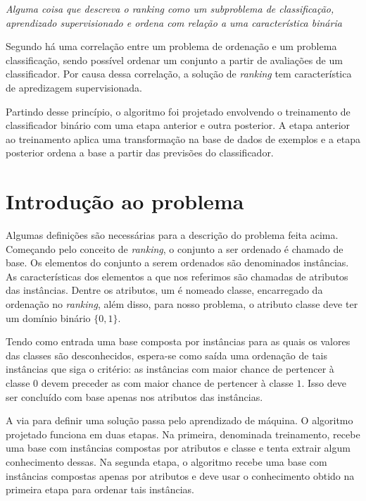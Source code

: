 \emph{Alguma coisa que descreva o ranking como um subproblema de classificação, aprendizado supervisionado e ordena com relação a uma característica binária}

Segundo \cite{langford08} há uma correlação entre um problema de ordenação e um problema classificação, sendo possível ordenar um conjunto a partir de avaliações de um classificador. Por causa dessa correlação, a solução de \emph{ranking} tem característica de apredizagem supervisionada.

Partindo desse princípio, o algoritmo foi projetado envolvendo o treinamento de classificador binário com uma etapa anterior e outra posterior. A etapa anterior ao treinamento aplica uma transformação na base de dados de exemplos e a etapa posterior  ordena a base a partir das previsões do classificador.


\section{Introdução ao problema}
Algumas definições são necessárias para a descrição do problema feita acima.
Começando pelo conceito de \emph{ranking}, o conjunto a ser ordenado é chamado
de base. Os elementos do conjunto a serem ordenados são denominados instâncias.
As características dos elementos a que nos referimos são chamadas de atributos
das instâncias. Dentre os atributos, um é nomeado classe, encarregado da
ordenação no \emph{ranking}, além disso, para nosso problema, o atributo classe
deve ter um domínio binário $\{0, 1\}$.

Tendo como entrada uma base composta por instâncias para as quais os valores
das classes são desconhecidos, espera-se como saída uma ordenação de tais
instâncias que siga o critério: as instâncias com maior chance de pertencer à
classe $0$ devem preceder as com maior chance de pertencer à classe $1$. Isso
deve ser concluído com base apenas nos atributos das instâncias.

A via para definir uma solução passa pelo aprendizado de máquina. O algoritmo
projetado funciona em duas etapas. Na primeira, denominada treinamento, recebe
uma base com instâncias compostas por atributos e classe e tenta extrair algum
conhecimento dessas. Na segunda etapa, o algoritmo recebe uma base com
instâncias compostas apenas por atributos e deve usar o conhecimento obtido na
primeira etapa para ordenar tais instâncias.

